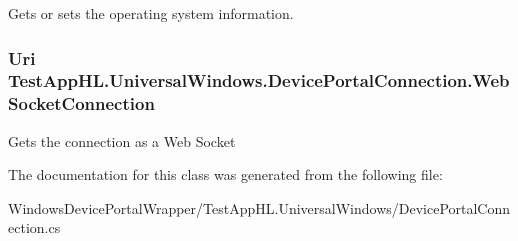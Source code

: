 Gets or sets the operating system information. 

\subsubsection[{\texorpdfstring{Web\+Socket\+Connection}{WebSocketConnection}}]{\setlength{\rightskip}{0pt plus 5cm}Uri Test\+App\+H\+L.\+Universal\+Windows.\+Device\+Portal\+Connection.\+Web\+Socket\+Connection\hspace{0.3cm}{\ttfamily [get]}}\hypertarget{class_test_app_h_l_1_1_universal_windows_1_1_device_portal_connection_a17da4cebf5c86f102bc7b06f4a699888}{}\label{class_test_app_h_l_1_1_universal_windows_1_1_device_portal_connection_a17da4cebf5c86f102bc7b06f4a699888}


Gets the connection as a Web Socket 



The documentation for this class was generated from the following file\+:\begin{DoxyCompactItemize}
\item 
Windows\+Device\+Portal\+Wrapper/\+Test\+App\+H\+L.\+Universal\+Windows/Device\+Portal\+Connection.\+cs\end{DoxyCompactItemize}

